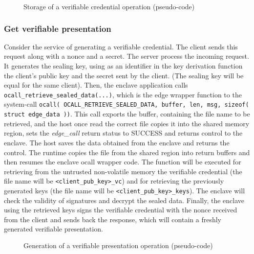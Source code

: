 \begin{figure}[!h]
    \centering
    
    \caption{Storage of a verifiable credential operation (pseudo-code)}
    \label{poc-store-vc}
\end{figure}
\subsubsection{Get verifiable presentation}
Consider the service of generating a verifiable credential. The client sends this request along with a nonce and a secret. The server process the incoming request. It generates the sealing key, using as an identifier in the key derivation function the client's public key and the secret sent by the client. (The sealing key will be equal for the same client). Then, the enclave application calls \texttt{ocall\_retrieve\_sealed\_data(...)}, which is the edge wrapper function to the system-call \texttt{ocall( OCALL\_RETRIEVE\_SEALED\_DATA, buffer, len, msg, sizeof( struct edge\_data ))}. This call exports the buffer, containing the file name to be retrieved, and the host once read the correct file copies it into the shared memory region, sets the \textit{edge\_call} return status to SUCCESS and returns control to the enclave. The host saves the data obtained from the enclave and returns the control. The runtime copies the file from the shared region into return buffers and then resumes the enclave ocall wrapper code.
The function will be executed for retrieving from the untrusted non-volatile memory the verifiable credential (the file name will be \texttt{<client\_pub\_key>\_vc}) and for retrieving the previously generated keys (the file name will be \texttt{<client\_pub\_key>\_keys}).
The enclave will check the validity of signatures and decrypt the sealed data.  
Finally, the enclave using the retrieved keys signs the verifiable credential with the nonce received from the client and sends back the response, which will contain a freshly generated verifiable presentation. \\

\begin{figure}[!h]
    \centering
    
    \caption{Generation of a verifiable presentation operation (pseudo-code)}
    \label{poc-get-vp}
\end{figure}

